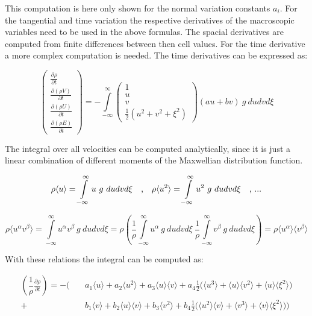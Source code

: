 \documentclass[
	pdftex,             %
	12pt,				%
	a4paper,		   	%
	english,				%
	oneside,			%
]{article}
\newcommand{\mom}[1]{\langle #1 \rangle}
\begin{document}
This computation is here only shown for the normal variation constants $a_i$. For the tangential and time variation the respective derivatives of the macroscopic variables need to be used in the above formulas. The spacial derivatives are computed from finite differences between then cell values. For the time derivative a more complex computation is needed. The time derivatives can be expressed as:

\begin{equation}
\begin{pmatrix}
	\frac{\partial \rho    }{\partial t} \\
	\frac{\partial (\rho V)}{\partial t} \\
	\frac{\partial (\rho U)}{\partial t} \\
	\frac{\partial (\rho E)}{\partial t}
\end{pmatrix}
 =
-%
\int \limits^{\infty}_{-\infty}
\begin{pmatrix}
	1 \\
	u \\
	v \\
	\frac{1}{2} ( u^2 + v^2 + \xi^2 )
\end{pmatrix}
(a u + b v) ~g~
du dv d\xi
\end{equation}

The integral over all velocities can be computed analytically, since it is just a linear combination of different moments of the Maxwellian distribution function.

\begin{equation}
\rho \mom{u} = \int \limits^{\infty}_{-\infty} u ~g~ du dv d\xi
~~~\textnormal{,} ~~~
\rho \mom{u^2} = \int \limits^{\infty}_{-\infty} u^2 ~g~ du dv d\xi
~~~\textnormal{, ...}
\end{equation}

\begin{equation}
\rho \mom{u^\alpha v^\beta}
= 
\int \limits^{\infty}_{-\infty} u^\alpha v^\beta ~g~ du dv d\xi
=
\rho \left(
\dfrac{1}{\rho}\int \limits^{\infty}_{-\infty} u^\alpha ~g~ du dv d\xi ~ 
\dfrac{1}{\rho}\int \limits^{\infty}_{-\infty} v^\beta  ~g~ du dv d\xi
\right)
=
\rho \mom{u^\alpha}\mom{v^\beta}
\end{equation}

With these relations the integral can be computed as:

\begin{eqnarray*}
\left( \dfrac{1}{\rho} \frac{\partial \rho}{\partial t} \right)
=
-%
\Bigg(
 &~&a_1 \mom{u} + a_2 \mom{u^2} + a_3 \mom{u}\mom{v}
+   a_4 \frac{1}{2} \Big( \mom{u^3} + \mom{u}\mom{v^2} + \mom{u}\mom{\xi^2} \Big)
\\
+&~&b_1 \mom{v} + b_2 \mom{u}\mom{v} + b_3 \mom{v^2}
+   b_4  \frac{1}{2} \Big( \mom{u^2}\mom{v} + \mom{v^3} + \mom{v}\mom{\xi^2} \Big)
\Bigg)
\end{eqnarray*}
\end{document}
